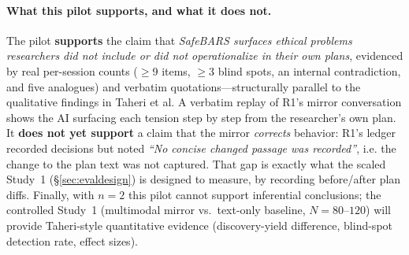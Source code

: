 \paragraph{What this pilot supports, and what it does not.}
The pilot \textbf{supports} the claim that \emph{SafeBARS surfaces ethical
problems researchers did not include or did not operationalize in their own
plans}, evidenced by real per-session counts ($\ge$9 items, $\ge$3 blind
spots, an internal contradiction, and five analogues) and verbatim
quotations---structurally parallel to the qualitative findings in Taheri et
al. A verbatim replay of R1's mirror conversation shows the AI surfacing
each tension step by step from the researcher's own plan. It \textbf{does not
yet support} a claim that the mirror \emph{corrects}
behavior: R1's ledger recorded decisions but noted \textit{``No concise
changed passage was recorded''}, i.e. the change to the plan text was not
captured. That gap is exactly what the scaled Study~1 (\S\ref{sec:evaldesign})
is designed to measure, by recording before/after plan diffs. Finally, with
$n=2$ this pilot cannot support inferential conclusions; the controlled
Study~1 (multimodal mirror vs.\ text-only baseline, $N=80$--$120$) will
provide Taheri-style quantitative evidence (discovery-yield difference,
blind-spot detection rate, effect sizes).
